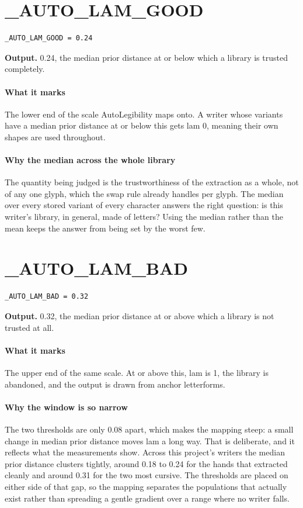 \section{\_AUTO\_LAM\_GOOD}
\begin{lstlisting}[style=sig]
_AUTO_LAM_GOOD = 0.24
\end{lstlisting}

\noindent\textbf{Output.} 0.24, the median prior distance at or below which a library is trusted completely.


\paragraph{What it marks}
The lower end of the scale AutoLegibility maps onto. A writer whose variants have a median prior distance at or below this gets lam 0, meaning their own shapes are used throughout.


\paragraph{Why the median across the whole library}
The quantity being judged is the trustworthiness of the extraction as a whole, not of any one glyph, which the swap rule already handles per glyph. The median over every stored variant of every character answers the right question: is this writer's library, in general, made of letters? Using the median rather than the mean keeps the answer from being set by the worst few.


\section{\_AUTO\_LAM\_BAD}
\begin{lstlisting}[style=sig]
_AUTO_LAM_BAD = 0.32
\end{lstlisting}

\noindent\textbf{Output.} 0.32, the median prior distance at or above which a library is not trusted at all.


\paragraph{What it marks}
The upper end of the same scale. At or above this, lam is 1, the library is abandoned, and the output is drawn from anchor letterforms.


\paragraph{Why the window is so narrow}
The two thresholds are only 0.08 apart, which makes the mapping steep: a small change in median prior distance moves lam a long way. That is deliberate, and it reflects what the measurements show. Across this project's writers the median prior distance clusters tightly, around 0.18 to 0.24 for the hands that extracted cleanly and around 0.31 for the two most cursive. The thresholds are placed on either side of that gap, so the mapping separates the populations that actually exist rather than spreading a gentle gradient over a range where no writer falls.


